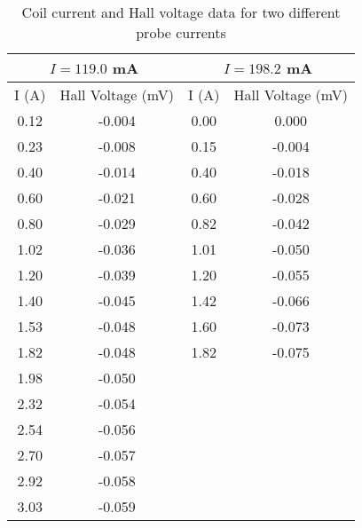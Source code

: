 \begin{table}[]
    \centering
    \begin{tabular}{|cc|cc|}
    \hline
    \multicolumn{2}{|c|}{$I=119.0$ mA} & \multicolumn{2}{c|}{$I=198.2$ mA} \\ \hline
    \multicolumn{1}{|c|}{I (A)} & Hall Voltage (mV) & \multicolumn{1}{c|}{I (A)} & Hall Voltage (mV) \\ \hline
    \multicolumn{1}{|c|}{0.12} & -0.004 & \multicolumn{1}{c|}{0.00} & 0.000 \\ \hline
    \multicolumn{1}{|c|}{0.23} & -0.008 & \multicolumn{1}{c|}{0.15} & -0.004 \\ \hline
    \multicolumn{1}{|c|}{0.40} & -0.014 & \multicolumn{1}{c|}{0.40} & -0.018 \\ \hline
    \multicolumn{1}{|c|}{0.60} & -0.021 & \multicolumn{1}{c|}{0.60} & -0.028 \\ \hline
    \multicolumn{1}{|c|}{0.80} & -0.029 & \multicolumn{1}{c|}{0.82} & -0.042 \\ \hline
    \multicolumn{1}{|c|}{1.02} & -0.036 & \multicolumn{1}{c|}{1.01} & -0.050 \\ \hline
    \multicolumn{1}{|c|}{1.20} & -0.039 & \multicolumn{1}{c|}{1.20} & -0.055 \\ \hline
    \multicolumn{1}{|c|}{1.40} & -0.045 & \multicolumn{1}{c|}{1.42} & -0.066 \\ \hline
    \multicolumn{1}{|c|}{1.53} & -0.048 & \multicolumn{1}{c|}{1.60} & -0.073 \\ \hline
    \multicolumn{1}{|c|}{1.82} & -0.048 & \multicolumn{1}{c|}{1.82} & -0.075 \\ \hline
    \multicolumn{1}{|c|}{1.98} & -0.050 & \multicolumn{1}{c|}{} &  \\ \hline
    \multicolumn{1}{|c|}{2.32} & -0.054 & \multicolumn{1}{c|}{} &  \\ \hline
    \multicolumn{1}{|c|}{2.54} & -0.056 & \multicolumn{1}{c|}{} &  \\ \hline
    \multicolumn{1}{|c|}{2.70} & -0.057 & \multicolumn{1}{c|}{} &  \\ \hline
    \multicolumn{1}{|c|}{2.92} & -0.058 & \multicolumn{1}{c|}{} &  \\ \hline
    \multicolumn{1}{|c|}{3.03} & -0.059 & \multicolumn{1}{c|}{} &  \\ \hline
    \end{tabular}
    \caption{Coil current and Hall voltage data for two different probe currents}
    \label{tab:coeff}
\end{table}